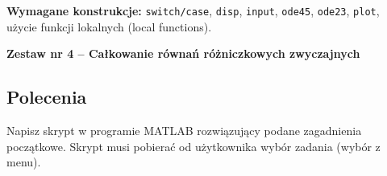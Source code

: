 \documentclass[a4paper,11pt]{article}
\begin{document}
\vspace{0.3cm}
\begin{ramka}
\textbf{Wymagane konstrukcje:}
\texttt{switch/case}, \texttt{disp}, \texttt{input}, \texttt{ode45}, \texttt{ode23}, \texttt{plot}, użycie funkcji lokalnych (local functions).
\end{ramka}

\clearpage
\begin{center}
  {\large\bfseries Zestaw nr 4 \quad -- \quad Całkowanie równań różniczkowych zwyczajnych}
\end{center}
\hrulefill
\vspace{0.4cm}

\subsection*{Polecenia}

Napisz skrypt w programie MATLAB rozwiązujący podane zagadnienia początkowe. Skrypt musi pobierać od użytkownika wybór zadania (wybór z menu).
\end{document}
